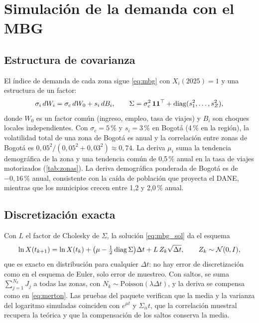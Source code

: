 \chapter{Simulación de la demanda con el MBG}\label{cap:simulacion}

\section{Estructura de covarianza}

El índice de demanda de cada zona sigue \eqref{eq:mbg} con $X_i(2025)=1$ y una estructura de un factor:
\begin{equation}\label{eq:factor}
\sigma_i\,dW_i=\sigma_c\,dW_0+s_i\,dB_i,\qquad
\Sigma=\sigma_c^2\,\mathbf 1\mathbf 1^\top+\operatorname{diag}(s_1^2,\dots,s_Z^2),
\end{equation}
donde $W_0$ es un factor común (ingreso, empleo, tasa de viajes) y $B_i$ son choques locales
independientes. Con $\sigma_c=5\,\%$ y $s_i=3\,\%$ en Bogotá (4\,\% en la región), la volatilidad total
de una zona de Bogotá es \SigmaZona{} anual y la correlación entre zonas de Bogotá es
$0{,}05^2/(0{,}05^2+0{,}03^2)\approx0{,}74$. La deriva $\mu_i$ suma la tendencia demográfica de la zona y
una tendencia común de 0,5\,\% anual en la tasa de viajes motorizados (\cref{tab:zonas}). La deriva
demográfica ponderada de Bogotá es de $-0{,}16\,\%$ anual, consistente con la caída de población que
proyecta el DANE, mientras que los municipios crecen entre 1,2 y 2,0\,\% anual.

\section{Discretización exacta}

Con $L$ el factor de Cholesky de $\Sigma$, la solución \eqref{eq:mbg_sol} da el esquema
\begin{equation}\label{eq:exacta}
\ln X(t_{k+1})=\ln X(t_k)+\big(\mu-\tfrac12\operatorname{diag}\Sigma\big)\Delta t+L\,Z_k\sqrt{\Delta t},\qquad Z_k\sim\mathcal N(0,I),
\end{equation}
que es exacto en distribución para cualquier $\Delta t$: no hay error de discretización como en el
esquema de Euler, solo error de muestreo. Con saltos, se suma $\sum_{j=1}^{N_k}J_j$ a todas las zonas,
con $N_k\sim\text{Poisson}(\lambda\Delta t)$, y la deriva se compensa como en \eqref{eq:merton}. Las
pruebas del paquete verifican que la media y la varianza del logaritmo simuladas coinciden con
$e^{\mu t}$ y $\Sigma_{ii}t$, que la correlación muestral recupera la teórica y que la compensación de
los saltos conserva la media.

